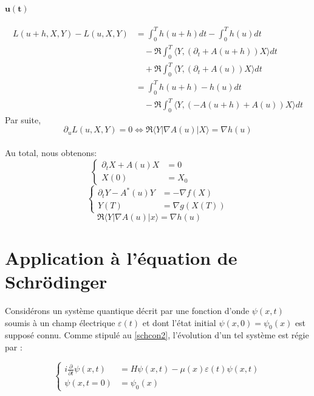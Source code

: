 \paragraph*{$\mathbf{u(t)}$}
\begin{align*}
L(u+h,X,Y) - L(u,X,Y) &= \int_{0}^{T}h(u+h)dt - \int_{0}^{T}h(u)dt\\
&\quad -\Re \int_{0}^{T}\langle Y,(\partial_{t}+A(u+h))X \rangle dt\\
&\quad +\Re \int_{0}^{T}\langle Y,(\partial_{t}+A(u))X \rangle dt\\
&= \int_{0}^{T}h(u+h)-h(u)dt\\
&\quad -\Re \int_{0}^{T}\langle Y,(-A(u+h)+A(u))X \rangle dt
\end{align*}
Par suite, 
\begin{equation}
\partial_{u} L(u,X,Y)=0 \iff \Re \langle Y|\nabla A(u)|X \rangle = \nabla h(u)
\end{equation}
\\Au total, nous obtenons:
\begin{equation}
\begin{cases}
\partial_{t}X +A(u)X &= 0\\
X(0) &=X_0\quad\quad\quad\quad
\end{cases}
\end{equation}
\begin{equation}
\begin{cases}
\partial_{t}Y -A^{*}(u)Y &= -\nabla f(X)\\
Y(T) &=\nabla g(X(T))
\end{cases}
\end{equation}
\begin{equation}
\Re \langle Y|\nabla A(u)|x \rangle = \nabla h(u) \quad\quad
\end{equation}
\section{Application à l'équation de Schrödinger}

Considérons un système quantique décrit par une fonction d’onde $\psi(x, t)$ soumis à un champ électrique $\varepsilon(t)$ et dont l’état initial $\psi(x, 0) = \psi_0 (x)$ est supposé connu. Comme stipulé au \eqref{schcon2}, l’évolution d’un tel système est régie par :

\begin{equation}
\begin{cases}
i \frac{\partial}{\partial t} \psi (x,t) &= H\psi(x,t) - \mu(x)\varepsilon(t)\psi(x,t)\\
\psi(x,t=0) &=\psi_0(x)
\end{cases}
\end{equation}

